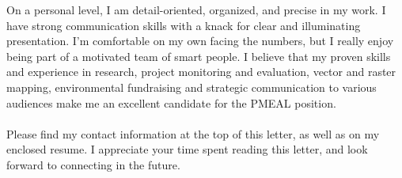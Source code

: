 \documentclass[11pt, a4paper]{awesome-cv}
\begin{document}
\begin{cvletter}
On a personal level, I am detail-oriented, organized, and precise in my work. I have strong communication skills with a knack for clear and illuminating presentation. I’m comfortable on my own facing the numbers, but I really enjoy being part of a motivated team of smart people. I believe that my proven skills and experience in research, project monitoring and evaluation, vector and raster mapping, environmental fundraising and strategic communication to various audiences make me an excellent candidate for the PMEAL position.\\\\
Please find my contact information at the top of this letter, as well as on my enclosed resume. I appreciate your time spent reading this letter, and look forward to connecting in the future.


\end{cvletter}


\makeletterclosing
\end{document}

